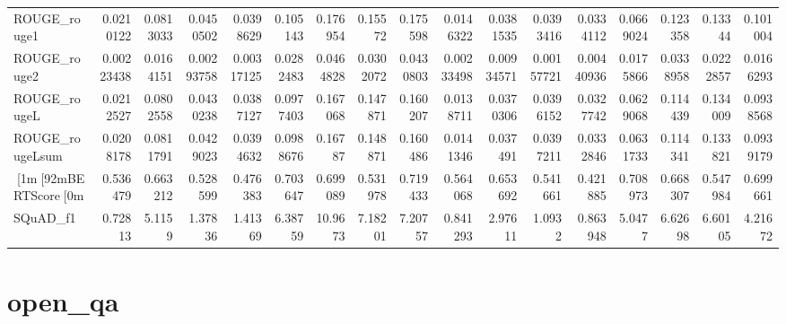 \begin{tabular}{lrrrrrrrrrrrrrrrr}
 ROUGE_rouge1    & 0.0210122  & 0.0813033 & 0.0450502   & 0.0398629   & 0.105143  &  0.176954  & 0.15572    &  0.175598  & 0.0146322  & 0.0381535  & 0.0393416  & 0.0334112   & 0.0669024 &  0.123358  & 0.13344     &  0.101004  \\
 ROUGE_rouge2    & 0.00223438 & 0.0164151 & 0.00293758  & 0.00317125  & 0.0282483 &  0.0464828 & 0.0302072  &  0.0430803 & 0.00233498 & 0.00934571 & 0.00157721 & 0.00440936  & 0.0175866 &  0.0338958 & 0.0222857   &  0.0166293 \\
 ROUGE_rougeL    & 0.0212527  & 0.0802558 & 0.0430238   & 0.0387127   & 0.0977403 &  0.167068  & 0.147871   &  0.160207  & 0.0138711  & 0.0370306  & 0.0396152  & 0.0327742   & 0.0629068 &  0.114439  & 0.134009    &  0.0938568 \\
 ROUGE_rougeLsum & 0.0208178  & 0.0811791 & 0.0429023   & 0.0394632   & 0.0988676 &  0.16787   & 0.148871   &  0.160486  & 0.0141346  & 0.037491   & 0.0397211  & 0.0332846   & 0.0631733 &  0.114341  & 0.133821    &  0.0939179 \\
 [1m[92mBERTScore[0m       & 0.536479   & 0.663212  & 0.528599    & 0.476383    & 0.703647  &  0.699089  & 0.531978   &  0.719433  & 0.564068   & 0.653692   & 0.541661   & 0.421885    & 0.708973  &  0.668307  & 0.547984    &  0.699661  \\
 SQuAD_f1        & 0.72813    & 5.1159    & 1.37836     & 1.41369     & 6.38759   & 10.9673    & 7.18201    &  7.20757   & 0.841293   & 2.97611    & 1.0932     & 0.863948    & 5.0477    &  6.62698   & 6.60105     &  4.21672   \\
\hline
\end{tabular}\section{open_qa}
